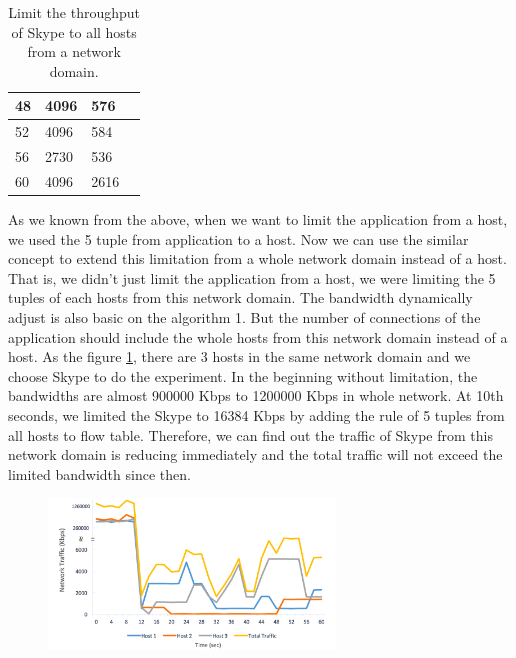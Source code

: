\documentclass[journal]{IEEEtran}
\begin{document}
\begin{table}[]
\begin{tabular}{|l|l|l|l|}
48       & 4096                                                                                                       & 576   \\ \hline
52       & 4096                                                                                                       & 584   \\ \hline
56       & 2730                                                                                                       & 536   \\ \hline
60       & 4096                                                                                                       & 2616   \\ \hline
\end{tabular}
\caption{Limit the throughput of Skype to all hosts from a network domain.}
\label{fig:qos_final_table}
\end{table}

As we known from the above, when we want to limit the application from a host, we used the 5 tuple from application to a host. Now we can use the similar concept to extend this limitation from a whole network domain instead of a host. That is, we didn’t just limit the application from a host, we were limiting the 5 tuples of each hosts from this network domain.
The bandwidth dynamically adjust is also basic on the algorithm 1. But the number of connections of the application should include the whole hosts from this network domain instead of a host.
As the figure \ref{fig:qos_final}, there are 3 hosts in the same network domain and we choose Skype to do the experiment. In the beginning without limitation, the bandwidths are almost 900000 Kbps to 1200000 Kbps in whole network. At 10th seconds, we limited the Skype to 16384 Kbps by adding the rule of 5 tuples from all hosts to flow table. Therefore, we can find out the traffic of Skype from this network domain is reducing immediately and the total traffic will not exceed the limited bandwidth since then.

\begin{figure}[!t]
\centering
\includegraphics[width=3in]{./figures/qos_final}
\label{fig:qos_final}
\end{figure}

\newpage



\end{document}
